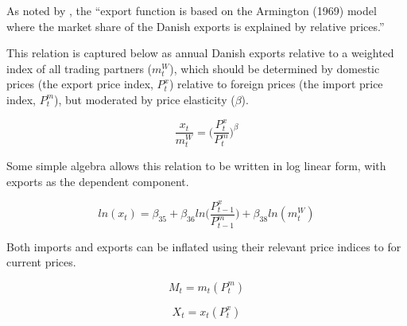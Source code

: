 \documentclass[
]{book}
\begin{document}
As noted by \citet[pp.~27]{byrialsenraza2019empirical}, the ``export function is based on the
Armington (1969) model where the market share of the Danish exports is explained by
relative prices.''

This relation is captured below as annual Danish exports relative to a weighted index
of all trading partners (\(m^W_t\)), which should be determined by domestic prices
(the export price index, \(P^x_t\)) relative to foreign prices (the import price
index, \(P^m_t\)), but moderated by price elasticity (\(\beta\)).

\begin{equation}
\frac{x_t}{m^W_t} = \Bigg( \frac{P^x_t}{P^m_t}\Bigg)^ \beta
\end{equation}

Some simple algebra allows this relation to be written in log linear form, with
exports as the dependent component.

\begin{equation}
ln(x_t) = \beta _{35} + \beta _{36}ln \Bigg(\frac{P^x_{t-1}}{P^m_{t-1}}\Bigg)  + \beta _{38}ln(m^W_t)
\end{equation}

Both imports and exports can be inflated using their relevant price indices to
for current prices.

\begin{equation}
M_t = m_t(P^m_t )
\end{equation}

\begin{equation}
X_t = x_t(P^x_t)
\end{equation}
\end{document}

